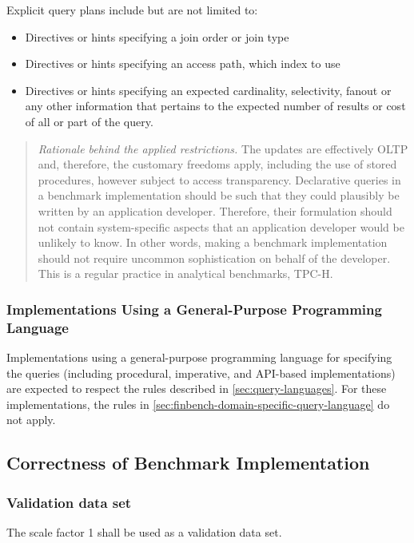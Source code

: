Explicit query plans include but are not limited to:
\begin{itemize}
    \item Directives or hints specifying a join order or join type
    \item Directives or hints specifying an access path, \eg which index to use
    \item Directives or hints specifying an expected cardinality, selectivity, fanout or any other information that pertains to the expected number of results or cost of all or part of the query.
\end{itemize}

\begin{quote}
    \emph{Rationale behind the applied restrictions.} The updates are effectively OLTP and, therefore, the customary freedoms apply, including the use of stored procedures, however subject to access transparency. Declarative queries in a benchmark implementation should be such that they could plausibly be written by an application developer. Therefore, their formulation should not contain system-specific aspects that an application developer would be unlikely to know. In other words, making a benchmark implementation should not require uncommon sophistication on behalf of the developer. This is a regular practice in analytical benchmarks, \eg \mbox{TPC-H}.
\end{quote}

\subsubsection{Implementations Using a General-Purpose Programming Language}
\label{sec:finbench-general-purpose-programming-language}

Implementations using a general-purpose programming language for specifying the queries (including procedural, imperative, and API-based implementations) are expected to respect the rules described in \autoref{sec:query-languages}.
For these implementations, the rules in \autoref{sec:finbench-domain-specific-query-language} do not apply.

\subsection{Correctness of Benchmark Implementation}

\subsubsection{Validation data set}
\label{sec:transaction-workload-validation-data-set}
The scale factor 1 shall be used as a validation data set.

